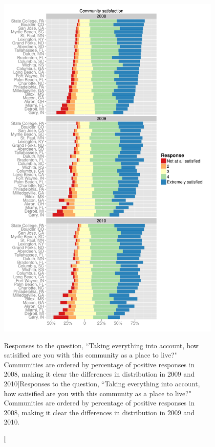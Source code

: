 \documentclass[smallextended]{svjour3}\usepackage[]{graphicx}\usepackage[]{color}
\newenvironment{knitrout}{}{} %
\begin{document}
\begin{knitrout}
\color{fgcolor}\begin{figure}

{\centering \includegraphics[width=0.99\linewidth]{figure/communitysatplot-1} 

}

\caption[Responses to the question, ``Taking everything into account, how satisified are you with this community as a place to live?" Communities are ordered by percentage of positive responses in 2008, making it clear the differences in distribution in 2009 and 2010]{Responses to the question, ``Taking everything into account, how satisified are you with this community as a place to live?" Communities are ordered by percentage of positive responses in 2008, making it clear the differences in distribution in 2009 and 2010.}\label{fig:communitysatplot}
\end{figure}


\end{knitrout}
\end{document}
